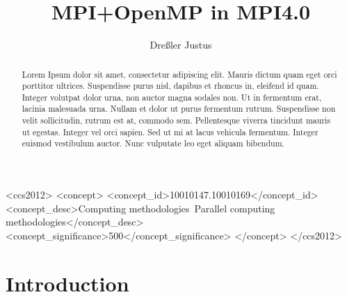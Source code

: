 \documentclass[sigconf]{acmart}
\begin{document}
\title{MPI+OpenMP in MPI4.0}
\author{Dreßler Justus}


\begin{CCSXML}
    <ccs2012>
    <concept>
    <concept_id>10010147.10010169</concept_id>
    <concept_desc>Computing methodologies~Parallel computing methodologies</concept_desc>
    <concept_significance>500</concept_significance>
    </concept>
    </ccs2012>
\end{CCSXML}


\begin{abstract}

    Lorem Ipsum dolor sit amet, consectetur adipiscing elit.
    Mauris dictum quam eget orci porttitor ultrices.
    Suspendisse purus nisl, dapibus et rhoncus in, eleifend id quam. Integer volutpat dolor urna, non auctor magna sodales non.
    Ut in fermentum erat, lacinia malesuada urna.
    Nullam et dolor ut purus fermentum rutrum.
    Suspendisse non velit sollicitudin, rutrum est at, commodo sem. Pellentesque viverra tincidunt mauris ut egestas.
    Integer vel orci sapien. Sed ut mi at lacus vehicula fermentum.
    Integer euismod vestibulum auctor.
    Nunc vulputate leo eget aliquam bibendum.

\end{abstract}

\maketitle

\section{Introduction}
\end{document}
